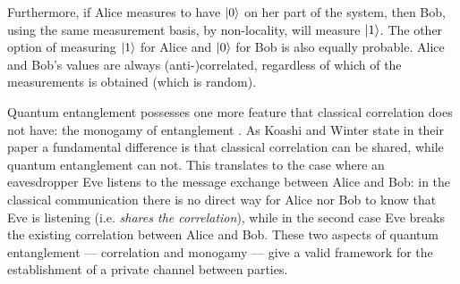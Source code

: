 	Furthermore, if Alice measures to have $|0 \rangle$ on her part of the system, then Bob, using the same measurement basis, by non-locality, will measure $|1 \rangle$.
	The other option of measuring $|1 \rangle$ for Alice and $|0 \rangle$ for Bob is also equally probable.
	Alice and Bob's values are always (anti-)correlated, regardless of which of the measurements is obtained (which is random).

	
	Quantum entanglement possesses one more feature that classical correlation does not have: the monogamy of entanglement \cite{KW04}. 
	As Koashi and Winter state in their paper a fundamental difference is that classical correlation can be shared, while quantum entanglement can not. 
	This translates to the case where an eavesdropper Eve listens to the message exchange between Alice and Bob: in the classical communication there is no direct way for Alice nor Bob to know that Eve is listening (i.e. \textit{shares the correlation}), while in the second case Eve breaks the existing correlation between Alice and Bob.
These two aspects of quantum entanglement --- correlation and monogamy --- give a valid framework for the establishment of a private channel between parties.
	
	
%			
		
